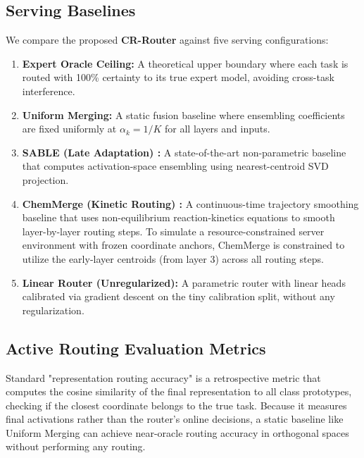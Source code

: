 \subsection{Serving Baselines}
We compare the proposed \textbf{CR-Router} against five serving configurations:
\begin{enumerate}
  \item \textbf{Expert Oracle Ceiling:} A theoretical upper boundary where each task is routed with 100\% certainty to its true expert model, avoiding cross-task interference.
  \item \textbf{Uniform Merging:} A static fusion baseline where ensembling coefficients are fixed uniformly at $\alpha_k = 1/K$ for all layers and inputs.
  \item \textbf{SABLE (Late Adaptation) \cite{sable2025samplewise}:} A state-of-the-art non-parametric baseline that computes activation-space ensembling using nearest-centroid SVD projection.
  \item \textbf{ChemMerge (Kinetic Routing) \cite{chemmerge2025kinetics}:} A continuous-time trajectory smoothing baseline that uses non-equilibrium reaction-kinetics equations to smooth layer-by-layer routing steps. To simulate a resource-constrained server environment with frozen coordinate anchors, ChemMerge is constrained to utilize the early-layer centroids (from layer 3) across all routing steps.
  \item \textbf{Linear Router (Unregularized):} A parametric router with linear heads calibrated via gradient descent on the tiny calibration split, without any regularization.
\end{enumerate}

\subsection{Active Routing Evaluation Metrics}
Standard "representation routing accuracy" is a retrospective metric that computes the cosine similarity of the final representation to all class prototypes, checking if the closest coordinate belongs to the true task. Because it measures final activations rather than the router's online decisions, a static baseline like Uniform Merging can achieve near-oracle routing accuracy in orthogonal spaces without performing any routing. 

